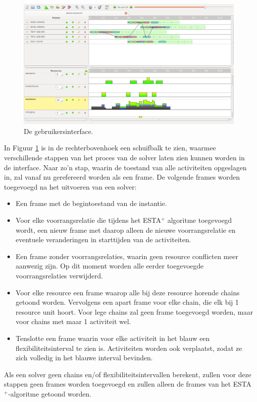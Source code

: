 \begin{figure}[H]
\centering
\includegraphics[width=.95\textwidth]{../images/GUIfinal.png}
\caption{De gebruikersinterface.}
\label{fig:GUIfinal}
\end{figure}

In Figuur \ref{fig:GUIfinal} is in de rechterbovenhoek een schuifbalk te zien, waarmee verschillende stappen van het proces van de solver laten zien kunnen worden in de interface. Naar zo'n stap, waarin de toestand van alle activiteiten opgeslagen in, zal vanaf nu gerefereerd worden als een frame. De volgende frames worden toegevoegd na het uitvoeren van een solver:
\begin{itemize}
\item Een frame met de begintoestand van de instantie.
\item Voor elke voorrangsrelatie die tijdens het ESTA$^+$ algoritme toegevoegd wordt, een nieuw frame met daarop alleen de nieuwe voorrangsrelatie en eventuele veranderingen in starttijden van de activiteiten.
\item Een frame zonder voorrangsrelaties, waarin geen resource conflicten meer aanwezig zijn. Op dit moment worden alle eerder toegevoegde voorrangsrelaties verwijderd.
\item Voor elke resource een frame waarop alle bij deze resource horende chains getoond worden. Vervolgens een apart frame voor elke chain, die elk bij 1 resource unit hoort. Voor lege chains zal geen frame toegevoegd worden, maar voor chains met maar 1 activiteit wel.
\item Tenslotte een frame waarin voor elke activiteit in het blauw een flexibiliteitsinterval te zien is. Activiteiten worden ook verplaatst, zodat ze zich volledig in het blauwe interval bevinden.
\end{itemize}
Als een solver geen chains en/of flexibiliteitsintervallen berekent, zullen voor deze stappen geen frames worden toegevoegd en zullen alleen de frames van het ESTA$^+$-algoritme getoond worden.

